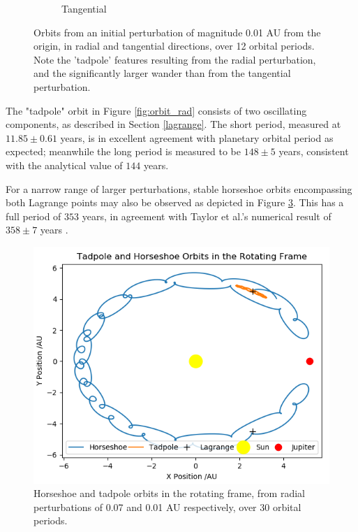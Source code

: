 \documentclass[11pt, a4paper,twocolumn]{article} %
\begin{document}
\begin{figure}[ht]
\begin{subfigure}{.23\textwidth}
		\caption{Tangential}
		\label{fig:orbit_tan}
	\end{subfigure}
	\caption{Orbits from an initial perturbation of magnitude 0.01 AU from the origin, in radial and tangential directions, over 12 orbital periods. Note the 'tadpole' features resulting from the radial perturbation, and the significantly larger wander than from the tangential perturbation.}
	\label{fig:orbitplots}
\end{figure}

The "tadpole" orbit in Figure \ref{fig:orbit_rad} consists of two oscillating components, as described in Section \ref{lagrange}. The short period, measured at $11.85 \pm 0.61$ years, is in excellent agreement with  planetary orbital period as expected; meanwhile the long period is measured to be $148 \pm 5$ years, consistent with the analytical value of $144$ years.

For a narrow range of larger perturbations, stable horseshoe orbits encompassing both Lagrange points may also be observed as depicted in Figure \ref{fig:horseshoe}. This has a full period of $353$ years, in agreement with Taylor et al.'s numerical result of $358 \pm 7$ years \cite{Taylor1981}.


\begin{figure}
	\centering
	\includegraphics[width=0.8\linewidth]{Figures/horseshoe}
	\caption{Horseshoe and tadpole orbits in the rotating frame, from radial perturbations of 0.07 and 0.01 AU respectively, over 30 orbital periods.}
	\label{fig:horseshoe}
\end{figure}
\end{document}
